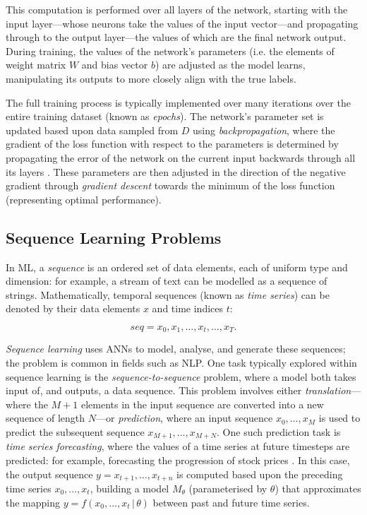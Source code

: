 \documentclass[a4paper, 11pt]{report}
\begin{document}
    This computation is performed over all layers of the network, starting with the input layer---whose neurons take the values of the input vector---and propagating through to the output layer—the values of which are the final network output. During training, the values of the network's parameters (i.e. the elements of weight matrix $W$ and bias vector $b$) are adjusted as the model learns, manipulating its outputs to more closely align with the true labels. 
    
    The full training process is typically implemented over many iterations over the entire training dataset (known as \emph{epochs}). The network's parameter set is updated based upon data sampled from $D$ using \emph{backpropagation}, where the gradient of the loss function with respect to the parameters is determined by propagating the error of the network on the current input backwards through all its layers \citep{zaras-2022}. These parameters are then adjusted in the direction of the negative gradient through \emph{gradient descent} towards the minimum of the loss function (representing optimal performance).


    \subsection{Sequence Learning Problems}

    In ML, a \emph{sequence} is an ordered set of data elements, each of uniform type and dimension: for example, a stream of text can be modelled as a sequence of strings. Mathematically, temporal sequences (known as \emph{time series}) can be denoted by their data elements $x$ and time indices $t$:

    \begin{equation}
        \label{eq: timeseries}
        seq = x_0, x_1, \ldots, x_t, \ldots, x_T
        \text{.}
    \end{equation}

    \emph{Sequence learning} uses ANNs to model, analyse, and generate these sequences; the problem is common in fields such as NLP. One task typically explored within sequence learning is the \emph{sequence-to-sequence} problem, where a model both takes input of, and outputs, a data sequence. This problem involves either \emph{translation}---where the $M+1$ elements in the input sequence are converted into a new sequence of length $N$---or \emph{prediction}, where an input sequence $x_0, \ldots, x_M$ is used to predict the subsequent sequence $x_{M+1}, \ldots, x_{M+N}$. One such prediction task is \emph{time series forecasting}, where the values of a time series at future timesteps are predicted: for example, forecasting the progression of stock prices \citep{darapaneni-2022}. In this case, the output sequence $y = x_{t+1}, \ldots, x_{t+n}$ is computed based upon the preceding time series $x_0, \ldots, x_t$, building a model $M_{\theta}$ (parameterised by $\theta$) that approximates the mapping $y = f ( x_0, \ldots, x_t \, \vert \, \theta )$ between past and future time series.
\end{document}
